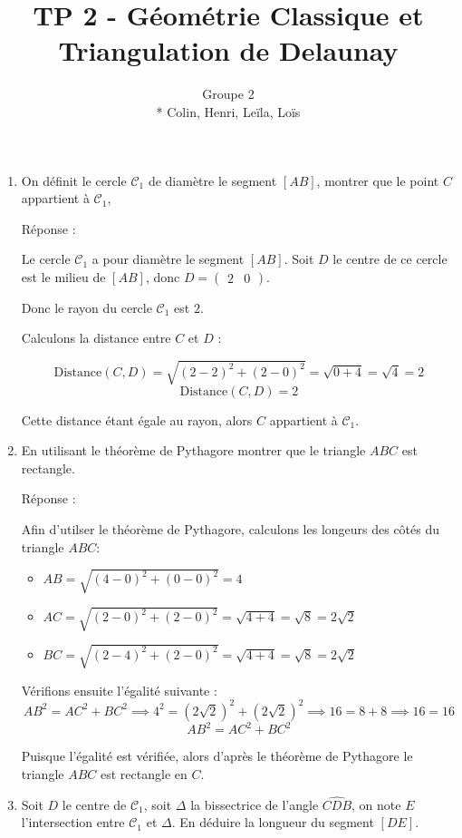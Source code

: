 \documentclass[a4paper,12pt]{article}
\title{TP 2 - Géométrie Classique et Triangulation de Delaunay}
\author{Groupe 2 \\* Colin, Henri, Leïla, Loïs}
\begin{document}
\maketitle



\begin{enumerate}
   \item On définit le cercle $\mathcal{C}_1$ de diamètre le segment $[AB]$, montrer que le point $C$ appartient à $\mathcal{C}_1$, 

Réponse :

  Le cercle $\mathcal{C}_1$ a pour diamètre le segment $[AB]$. Soit $D$ le centre de ce cercle est le milieu de $[AB]$, donc $D = \begin{pmatrix}2 & 0\end{pmatrix}$.

  Donc le rayon du cercle $\mathcal{C}_1$ est $2$.

  Calculons la distance entre $C$ et $D$ :

  \[
  \text{Distance}(C, D) = \sqrt{(2-2)^2 + (2-0)^2} = \sqrt{0 + 4} = \sqrt{4} = 2
  \]
  \[
\boxed{
  \text{Distance}(C, D) = 2}
  \]

  Cette distance étant égale au rayon, alors $C$ appartient à $\mathcal{C}_1$.
\newline
   \item En utilisant le théorème de Pythagore montrer que le triangle $ABC$ est rectangle. 

  Réponse :

  Afin d'utilser le théorème de Pythagore, calculons les longeurs des côtés du triangle $ABC$:

  \begin{itemize}
    	\item $AB = \sqrt{(4-0)^2 + (0-0)^2} = 4$
    	\item $AC = \sqrt{(2-0)^2 + (2-0)^2} = \sqrt{4 + 4} = \sqrt{8} = 2\sqrt{2}$
    	\item $BC = \sqrt{(2-4)^2 + (2-0)^2} = \sqrt{4 + 4} = \sqrt{8} = 2\sqrt{2}$
  \end{itemize}

  Vérifions ensuite l'égalité suivante :
  \[
  AB^2 = AC^2 + BC^2 \implies 4^2 = (2\sqrt{2})^2 + (2\sqrt{2})^2 \implies 16 = 8 + 8 \implies 16 = 16
  \]
  \[
  \boxed{
  AB^2 = AC^2 + BC^2
  }
  \]

  Puisque l'égalité est vérifiée, alors d'après le théorème de Pythagore le triangle $ABC$ est rectangle en $C$.
\newpage
   \item Soit $D$ le centre de $\mathcal{C}_1$, soit $\Delta$ la bissectrice de l'angle $\widehat{CDB}$, on note $E$ l'intersection entre $\mathcal{C}_1$ et $\Delta$. En déduire la longueur du segment $[DE]$. 


\end{enumerate}
\end{document}
